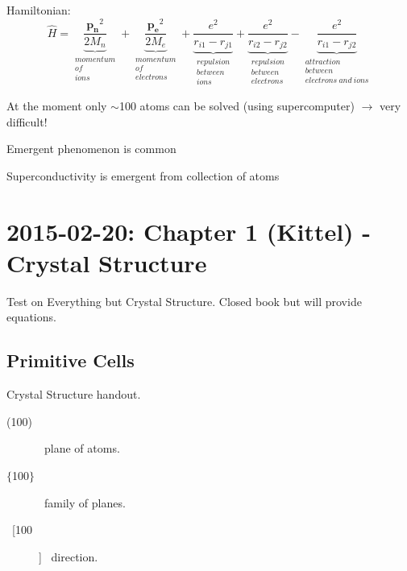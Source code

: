 \documentclass[english, 11pt]{article}
\begin{document}
		Hamiltonian:
		\begin{equation*}
				\hat{H} = \underbrace{\frac{\mathbf{p_n}^2}{2 M_n}}_{\substack{momentum\\of\\ions}} + 
							\underbrace{\frac{\mathbf{p_e}^2}{2 M_e}}_{\substack{momentum\\of\\electrons}} +
							\underbrace{\frac{e^2}{r_{i1}-r_{j1}}}_{\substack{repulsion\\between\\ions}}  + 
							\underbrace{\frac{e^2}{r_{i2}-r_{j2}}}_{\substack{repulsion\\between\\electrons}}  -
							\underbrace{\frac{e^2}{r_{i1}-r_{j2}}}_{\substack{attraction\\between\\electrons\ and\ ions}}
		\end{equation*}
		
		At the moment only $\sim$100 atoms can be solved (using supercomputer) $\rightarrow$ very difficult! \\
		\begin{description}
			\item Emergent phenomenon is common
			\begin{description}
				\item Superconductivity is emergent from collection of atoms
			\end{description}
		\end{description}
	


	\pagebreak
	\section{2015-02-20: Chapter 1 (Kittel) - Crystal Structure}
		Test on Everything but Crystal Structure.
		Closed book but will provide equations.
		\subsection{Primitive Cells}
			Crystal Structure handout.
			\begin{description}
				\item[(100)]  \ 
					plane of atoms.
				\item[$\{$100$\}$] \
					family of planes.
				\item[\ [100] ] \
					direction.
			\end{description}
			
\end{document}
